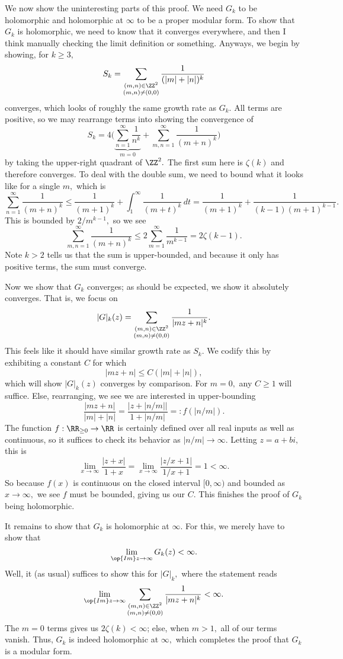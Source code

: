 We now show the uninteresting parts of this proof. We need $G_k$ to be holomorphic and holomorphic at $\infty$ to be a proper modular form. To show that $G_k$ is holomorphic, we need to know that it converges everywhere, and then I think manually checking the limit definition or something. Anyways, we begin by showing, for $k\ge3,$
\[S_k=\sum_{\substack{(m,n)\in\ZZ^2\\(m,n)\ne(0,0)}}\frac1{(|m|+|n|)^k}\]
converges, which looks of roughly the same growth rate as $G_k.$ All terms are positive, so we may rearrange terms into showing the convergence of
\[S_k=4\Bigg(\underbrace{\sum_{n=1}^\infty\frac1{n^k}}_{m=0}+\sum_{m,n=1}^\infty\frac1{(m+n)^k}\Bigg)\]
by taking the upper-right quadrant of $\ZZ^2.$ The first sum here is $\zeta(k)$ and therefore converges. To deal with the double sum, we need to bound what it looks like for a single $m,$ which is
\[\sum_{n=1}^\infty\frac1{(m+n)^k}\le\frac1{(m+1)^k}+\int_1^\infty\frac1{(m+t)^k}\,dt=\frac1{(m+1)^k}+\frac1{(k-1)(m+1)^{k-1}}.\]
This is bounded by $2/m^{k-1},$ so we see
\[\sum_{m,n=1}^\infty\frac1{(m+n)^k}\le2\sum_{m=1}^\infty\frac1{m^{k-1}}=2\zeta(k-1).\]
Note $k>2$ tells us that the sum is upper-bounded, and because it only has positive terms, the sum must converge.

Now we show that $G_k$ converges; as should be expected, we show it absolutely converges. That is, we focus on
\[|G|_k(z)=\sum_{\substack{(m,n)\in\ZZ^2\\(m,n)\ne(0,0)}}\frac1{|mz+n|^k}.\]
This feels like it should have similar growth rate as $S_k.$ We codify this by exhibiting a constant $C$ for which
\[|mz+n|\le C(|m|+|n|),\]
which will show $|G|_k(z)$ converges by comparison. For $m=0,$ any $C\ge1$ will suffice. Else, rearranging, we see we are interested in upper-bounding
\[\frac{|mz+n|}{|m|+|n|}=\frac{|z+|n/m||}{1+|n/m|}=:f(|n/m|).\]
The function $f:\RR_{\ge0}\to\RR$ is certainly defined over all real inputs as well as continuous, so it suffices to check its behavior as $|n/m|\to\infty.$ Letting $z=a+bi,$ this is
\[\lim_{x\to\infty}\frac{|z+x|}{1+x}=\lim_{x\to\infty}\frac{|z/x+1|}{1/x+1}=1<\infty.\]
So because $f(x)$ is continuous on the closed interval $[0,\infty)$ and bounded as $x\to\infty,$ we see $f$ must be bounded, giving us our $C.$ This finishes the proof of $G_k$ being holomorphic.

It remains to show that $G_k$ is holomorphic at $\infty.$ For this, we merely have to show that
\[\lim_{\op{Im}z\to\infty}G_k(z)<\infty.\]
Well, it (as usual) suffices to show this for $|G|_k,$ where the statement reads
\[\lim_{\op{Im}z\to\infty}\sum_{\substack{(m,n)\in\ZZ^2\\(m,n)\ne(0,0)}}\frac1{|mz+n|^k}<\infty.\]
The $m=0$ terms gives us $2\zeta(k)<\infty$; else, when $m>1,$ all of our terms vanish. Thus, $G_k$ is indeed holomorphic at $\infty,$ which completes the proof that $G_k$ is a modular form.

